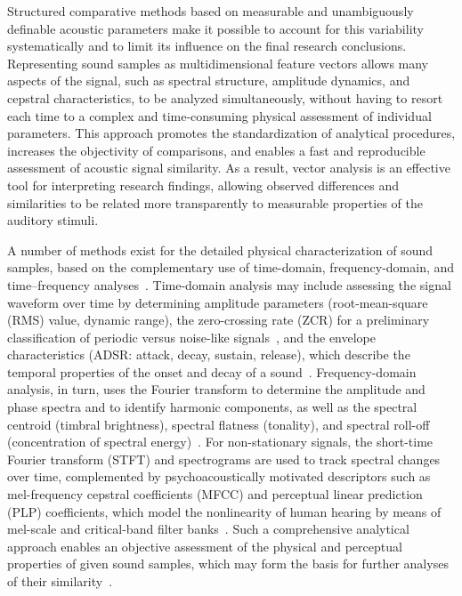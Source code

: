 \documentclass[preprint,12pt]{elsarticle}
\begin{document}
Structured comparative methods based on measurable and unambiguously definable acoustic parameters make it possible to account for this variability systematically and to limit its influence on the final research conclusions. Representing sound samples as multidimensional feature vectors allows many aspects of the signal, such as spectral structure, amplitude dynamics, and cepstral characteristics, to be analyzed simultaneously, without having to resort each time to a complex and time-consuming physical assessment of individual parameters. This approach promotes the standardization of analytical procedures, increases the objectivity of comparisons, and enables a fast and reproducible assessment of acoustic signal similarity. As a result, vector analysis is an effective tool for interpreting research findings, allowing observed differences and similarities to be related more transparently to measurable properties of the auditory stimuli.

A number of methods exist for the detailed physical characterization of sound samples, based on the complementary use of time-domain, frequency-domain, and time--frequency analyses~\cite{Letowski1989SoundQuality,Peeters2004CUIDADO}. Time-domain analysis may include assessing the signal waveform over time by determining amplitude parameters (root-mean-square (RMS) value, dynamic range), the zero-crossing rate (ZCR) for a preliminary classification of periodic versus noise-like signals~\cite{Gouyon2000}, and the envelope characteristics (ADSR: attack, decay, sustain, release), which describe the temporal properties of the onset and decay of a sound~\cite{Peeters2004CUIDADO}. Frequency-domain analysis, in turn, uses the Fourier transform to determine the amplitude and phase spectra and to identify harmonic components, as well as the spectral centroid (timbral brightness), spectral flatness (tonality), and spectral roll-off (concentration of spectral energy)~\cite{Peeters2004CUIDADO,saitis2020brightness}.
For non-stationary signals, the short-time Fourier transform (STFT) and spectrograms are used to track spectral changes over time, complemented by psychoacoustically motivated descriptors such as mel-frequency cepstral coefficients (MFCC) and perceptual linear prediction (PLP) coefficients, which model the nonlinearity of human hearing by means of mel-scale and critical-band filter banks~\cite{Hermansky1990,tracey2023interpretable_mfcc}.
Such a comprehensive analytical approach enables an objective assessment of the physical and perceptual properties of given sound samples, which may form the basis for further analyses of their similarity~\cite{Peeters2004CUIDADO}.
\end{document}
